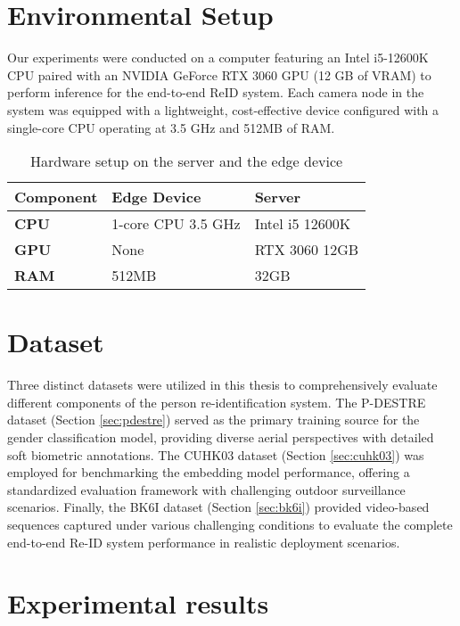 \documentclass[../main.tex]{subfiles}
\begin{document}
\section{Environmental Setup}
\label{sec:environmental_setup}

Our experiments were conducted on a computer featuring an Intel i5-12600K CPU paired with an NVIDIA GeForce RTX 3060 GPU (12 GB of VRAM) to perform inference for the end-to-end ReID system. Each camera node in the system was equipped with a lightweight, cost-effective device configured with a single-core CPU operating at 3.5 GHz and 512MB of RAM.

\begin{table}[h]
\centering
\caption{Hardware setup on the server and the edge device}
\label{tab:hardware_setup}
\begin{tabular}{|p{3.5cm}|p{5cm}|p{5cm}|}
\hline
\textbf{Component} & \textbf{Edge Device} & \textbf{Server} \\
\hline
\textbf{CPU} & 1-core CPU 3.5 GHz & Intel i5 12600K \\
\hline
\textbf{GPU} & None & RTX 3060 12GB \\
\hline
\textbf{RAM} & 512MB & 32GB \\
\hline
\end{tabular}
\end{table}

\section{Dataset}
\label{sec:dataset}

Three distinct datasets were utilized in this thesis to comprehensively evaluate different components of the person re-identification system. The P-DESTRE dataset (Section \ref{sec:pdestre}) served as the primary training source for the gender classification model, providing diverse aerial perspectives with detailed soft biometric annotations. The CUHK03 dataset (Section \ref{sec:cuhk03}) was employed for benchmarking the embedding model performance, offering a standardized evaluation framework with challenging outdoor surveillance scenarios. Finally, the BK6I dataset (Section \ref{sec:bk6i}) provided video-based sequences captured under various challenging conditions to evaluate the complete end-to-end Re-ID system performance in realistic deployment scenarios.



\section{Experimental results}
\label{sec:experimental_results}
\end{document}
